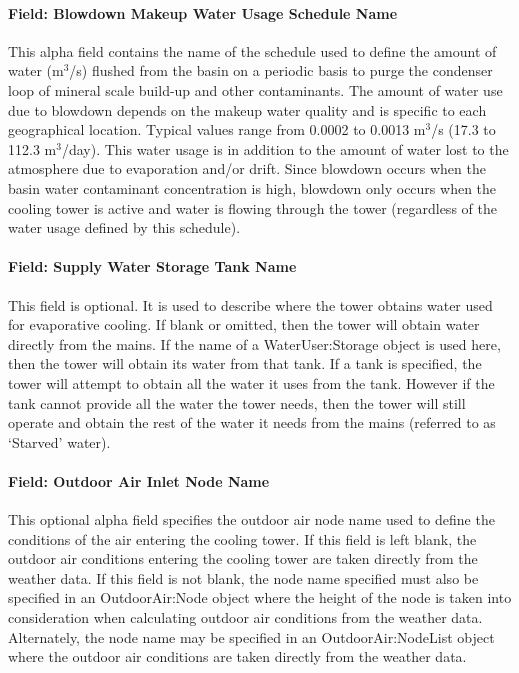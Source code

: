 \paragraph{Field: Blowdown Makeup Water Usage Schedule Name}\label{field-blowdown-makeup-water-usage-schedule-name-3}

This alpha field contains the name of the schedule used to define the amount of water (m\(^{3}\)/s) flushed from the basin on a periodic basis to purge the condenser loop of mineral scale build-up and other contaminants. The amount of water use due to blowdown depends on the makeup water quality and is specific to each geographical location. Typical values range from 0.0002 to 0.0013 m\(^{3}\)/s (17.3 to 112.3 m\(^{3}\)/day). This water usage is in addition to the amount of water lost to the atmosphere due to evaporation and/or drift. Since blowdown occurs when the basin water contaminant concentration is high, blowdown only occurs when the cooling tower is active and water is flowing through the tower (regardless of the water usage defined by this schedule).

\paragraph{Field: Supply Water Storage Tank Name}\label{field-supply-water-storage-tank-name-3}

This field is optional. It is used to describe where the tower obtains water used for evaporative cooling. If blank or omitted, then the tower will obtain water directly from the mains. If the name of a WaterUser:Storage object is used here, then the tower will obtain its water from that tank. If a tank is specified, the tower will attempt to obtain all the water it uses from the tank. However if the tank cannot provide all the water the tower needs, then the tower will still operate and obtain the rest of the water it needs from the mains (referred to as `Starved' water).

\paragraph{Field: Outdoor Air Inlet Node Name}\label{field-outdoor-air-inlet-node-name-3}

This optional alpha field specifies the outdoor air node name used to define the conditions of the air entering the cooling tower. If this field is left blank, the outdoor air conditions entering the cooling tower are taken directly from the weather data. If this field is not blank, the node name specified must also be specified in an OutdoorAir:Node object where the height of the node is taken into consideration when calculating outdoor air conditions from the weather data. Alternately, the node name may be specified in an OutdoorAir:NodeList object where the outdoor air conditions are taken directly from the weather data.

